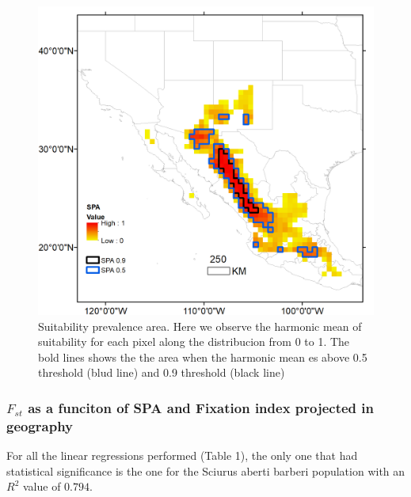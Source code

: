 \documentclass[
]{article}
\begin{document}
\begin{figure}
\centering
\includegraphics{all_figures/figure_4.png}
\caption{Suitability prevalence area. Here we observe the harmonic mean
of suitability for each pixel along the distribucion from 0 to 1. The
bold lines shows the the area when the harmonic mean es above 0.5
threshold (blud line) and 0.9 threshold (black line)}
\end{figure}

\hypertarget{f_st-as-a-funciton-of-spa-and-fixation-index-projected-in-geography}{%
\subsubsection{\texorpdfstring{\(F_{st}\) as a funciton of SPA and
Fixation index projected in
geography}{F\_\{st\} as a funciton of SPA and Fixation index projected in geography}}\label{f_st-as-a-funciton-of-spa-and-fixation-index-projected-in-geography}}

For all the linear regressions performed (Table 1), the only one that
had statistical significance is the one for the Sciurus aberti barberi
population with an \(R^2\) value of \(0.794\).
\end{document}
